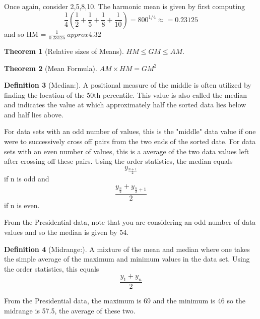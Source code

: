\documentclass[10pt,]{book}
\theoremstyle{plain}
\newtheorem{theorem}{Theorem}[section]
\theoremstyle{definition}
\newtheorem{definition}[theorem]{Definition}
\theoremstyle{definition}
\numberwithin{equation}{section}
\begin{document}
	Once again, consider {2,5,8,10}. The harmonic mean is given by first computing
	\begin{equation*}\frac{1}{4} (\frac{1}{2} + \frac{1}{5} + \frac{1}{8} + \frac{1}{10}) = 800^{1/4} \approx = 0.23125\end{equation*}
	and so HM = \(\frac{1}{0.23125} \ approx 4.32\)
\begin{theorem}[Relative sizes of Means]\label{theorem-5}
\(HM \le GM \le AM\). \end{theorem}
\begin{theorem}[Mean Formula]\label{theorem-6}
\(AM×HM=GM^2\)\end{theorem}
\begin{definition}[Median:]\label{definition-10}
A positional measure of the middle is often utilized by finding the location of the 50th percentile. This value is also called the median and indicates the value at which approximately half the sorted data lies below and half lies above.%
\end{definition}
\par

For data sets with an odd number of values, this is the "middle" data value if one were to successively cross off pairs from the two ends of the sorted date. For data sets with an even number of values, this is a average of the two data values left after crossing off these pairs.  Using the order statistics, the median equals
\begin{equation*}y_{\frac{n+1}{2}}\end{equation*}
if n is odd and
\begin{equation*}\frac{y_\frac{n}{2} + y_{\frac{n}{2}+1}}{2}\end{equation*}
if n is even.
%
\par
From the Presidential data, note that you are considering an odd number of data values and so the median is given by 54. %
\begin{definition}[Midrange:]\label{definition-11}
A mixture of the mean and median where one takes the simple average of the maximum and minimum values in the data set. Using the order statistics, this equals 
\begin{equation*}\frac{y_1+y_n}{2}\end{equation*}
%
\end{definition}
\par
From the Presidential data, the maximum is 69 and the minimum is 46 so the midrange is 57.5, the average of these two. %
\par
\end{document}
